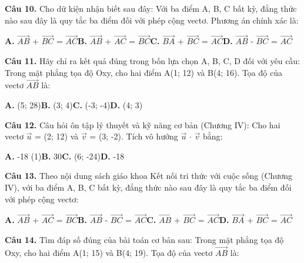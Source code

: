 \documentclass[11pt,a4paper]{article}
\begin{document}
\textbf{\color{primary} Câu 10.} Cho dữ kiện nhận biết sau đây: Với ba điểm A, B, C bất kỳ, đẳng thức nào sau đây là quy tắc ba điểm đối với phép cộng vectơ. Phương án chính xác là:\par
\hspace*{1.5em}\textbf{A.} $\overrightarrow{AB}$ + $\overrightarrow{BC}$ = $\overrightarrow{AC}$\quad\quad \textbf{B.} $\overrightarrow{AB}$ + $\overrightarrow{AC}$ = $\overrightarrow{BC}$\quad\quad \textbf{C.} $\overrightarrow{BA}$ + $\overrightarrow{BC}$ = $\overrightarrow{AC}$\quad\quad \textbf{D.} $\overrightarrow{AB}$ - $\overrightarrow{BC}$ = $\overrightarrow{AC}$\par\vspace{2pt}
\textbf{\color{primary} Câu 11.} Hãy chỉ ra kết quả đúng trong bốn lựa chọn A, B, C, D đối với yêu cầu: Trong mặt phẳng tọa độ Oxy, cho hai điểm A(1; 12) và B(4; 16). Tọa độ của vectơ $\overrightarrow{AB}$ là:\par
\hspace*{1.5em}\textbf{A.} (5; 28)\quad\quad \textbf{B.} (3; 4)\quad\quad \textbf{C.} (-3; -4)\quad\quad \textbf{D.} (4; 3)\par\vspace{2pt}
\textbf{\color{primary} Câu 12.} Câu hỏi ôn tập lý thuyết và kỹ năng cơ bản (Chương IV): Cho hai vectơ $\vec{u}$ = (2; 12) và $\vec{v}$ = (3; -2). Tích vô hướng $\vec{u}$ $\cdot$ $\vec{v}$ bằng:\par
\hspace*{1.5em}\textbf{A.} -18 (1)\quad\quad \textbf{B.} 30\quad\quad \textbf{C.} (6; -24)\quad\quad \textbf{D.} -18\par\vspace{2pt}
\textbf{\color{primary} Câu 13.} Theo nội dung sách giáo khoa Kết nối tri thức với cuộc sống (Chương IV), với ba điểm A, B, C bất kỳ, đẳng thức nào sau đây là quy tắc ba điểm đối với phép cộng vectơ:\par
\hspace*{1.5em}\textbf{A.} $\overrightarrow{AB}$ + $\overrightarrow{AC}$ = $\overrightarrow{BC}$\quad\quad \textbf{B.} $\overrightarrow{AB}$ - $\overrightarrow{BC}$ = $\overrightarrow{AC}$\quad\quad \textbf{C.} $\overrightarrow{AB}$ + $\overrightarrow{BC}$ = $\overrightarrow{AC}$\quad\quad \textbf{D.} $\overrightarrow{BA}$ + $\overrightarrow{BC}$ = $\overrightarrow{AC}$\par\vspace{2pt}
\textbf{\color{primary} Câu 14.} Tìm đáp số đúng của bài toán cơ bản sau: Trong mặt phẳng tọa độ Oxy, cho hai điểm A(1; 15) và B(4; 19). Tọa độ của vectơ $\overrightarrow{AB}$ là:\par
\end{document}
